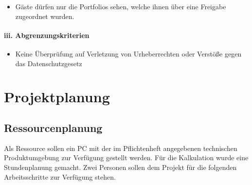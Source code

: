 \documentclass[10pt]{scrarticle}
\begin{document}
\begin{itemize}
\item Gäste dürfen nur die Portfolios sehen, welche ihnen über eine Freigabe zugeordnet wurden.
\end{itemize}

\paragraph{iii. Abgrenzungskriterien}

\begin{itemize}
\item Keine Überprüfung auf Verletzung von Urheberrechten oder Verstöße gegen das    Datenschutzgesetz
\end{itemize}


\section{Projektplanung}
\subsection{Ressourcenplanung}
Als Ressource sollen ein PC mit der im Pflichtenheft angegebenen technischen Produktumgebung zur Verfügung gestellt werden. Für die Kalkulation wurde eine Stundenplanung gemacht. Zwei Personen sollen dem Projekt für die folgenden Arbeitsschritte zur Verfügung stehen.
\end{document}
